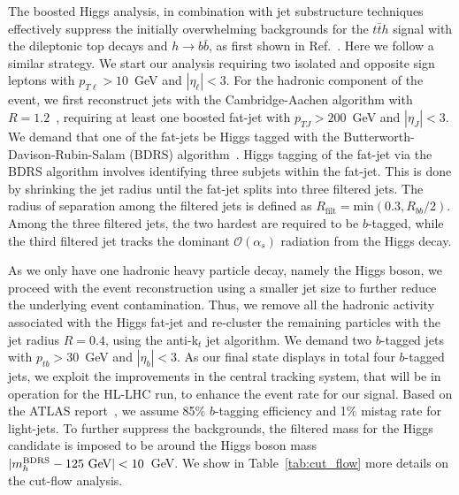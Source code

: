 \documentclass[reprint, aps,prd, preprintnumbers,groupedaddress,nofootinbib]{revtex4-1}
\begin{document}
The boosted Higgs analysis, in combination with jet substructure techniques  effectively suppress the initially  overwhelming backgrounds for the  $t \bar t h$ signal with the dileptonic top decays and $h\to b\bar{b}$, as first shown in Ref.~\cite{Buckley:2015vsa}. Here we follow a similar strategy. We start our analysis requiring two isolated and opposite sign leptons with $p_{T\ell} >10$~GeV and $|\eta_\ell|<3$. For the hadronic component of the event, we first reconstruct jets with the Cambridge-Aachen algorithm with $R=1.2$~\cite{Cacciari:2011ma},  requiring at least one boosted fat-jet with $p_{TJ}>200$~GeV and $|\eta_J|<3$. We demand that one of the fat-jets be Higgs tagged with the Butterworth-Davison-Rubin-Salam (BDRS) algorithm~\cite{Butterworth:2008iy,Plehn:2009rk}. Higgs tagging of the fat-jet via the BDRS algorithm involves identifying three subjets within the fat-jet. This is done by shrinking the jet radius until the fat-jet splits into three filtered jets. The radius of separation among the filtered jets is defined as $R_\text{filt}=\text{min}(0.3,R_{bb}/2)$. Among the three filtered jets, the two hardest are required to be $b$-tagged, while the third filtered jet tracks the dominant $\mathcal{O}(\alpha_s)$ radiation from the Higgs decay. 

As we only have one hadronic heavy particle decay, namely the Higgs boson, we proceed with the event reconstruction using a smaller jet size to further reduce the  underlying event contamination. Thus, we remove all the hadronic activity associated with the Higgs fat-jet and re-cluster the remaining particles with the jet radius $R=0.4$, using the anti-k$_t$ jet algorithm. We demand two $b$-tagged jets with $p_{tb}>30$~GeV and $|\eta_b|<3$. As our final state displays in total four $b$-tagged jets, we exploit the  improvements in the central tracking system, that will be in operation for the HL-LHC run, to enhance the event rate for our signal. Based on the ATLAS report~\cite{CERN-LHCC-2017-021}, we assume 85\% $b$-tagging efficiency and 1\% mistag rate for light-jets. To further suppress the backgrounds, the filtered  mass for the Higgs candidate is imposed to be around the Higgs boson mass $|m_h^\text{BDRS}-125\ {\rm GeV}|<10$~GeV. We show in Table~\ref{tab:cut_flow} more details on the cut-flow analysis. 
\end{document}
